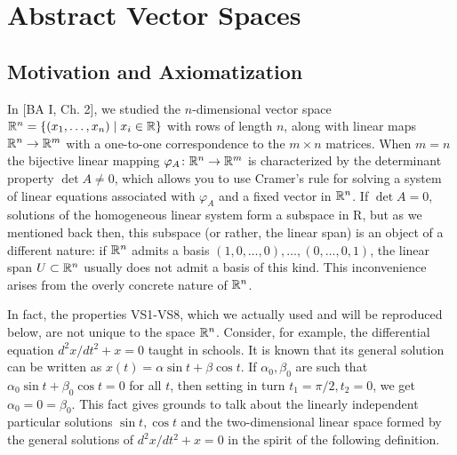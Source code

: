 \section{Abstract Vector Spaces}
\subsection{Motivation and Axiomatization}
In [BA I, Ch. 2], we studied the $n$-dimensional vector space ${\mathbb{R}}^n =\{(x_1,\dots ,x_n)\mid x_i \in {\mathbb{R}}\}$ with rows of length $n$, along with linear maps ${\mathbb{R}}^n \to {\mathbb{R}}^m$ with a one-to-one correspondence to the $m\times n$ matrices. When $m = n$ the bijective linear mapping $\varphi_A\colon {\mathbb{R}}^n \to {\mathbb{R}}^m$ is characterized by the determinant property $\det A \neq 0$, which allows you to use Cramer's rule for solving a system of linear equations associated with $\varphi_A$ and a fixed vector in ${\mathbb{R}}^n$. If $\det A = 0$, solutions of the homogeneous linear system form a subspace in R, but as we mentioned back then, this subspace (or rather, the linear span) is an object of a different nature: if ${\mathbb{R}}^n$ admits a basis $(1,0,\dots ,0),\dots ,(0,\dots ,0,1)$, the linear span $U\subset{\mathbb{R}}^n$ usually does not admit a basis of this kind. This inconvenience arises from the overly concrete nature of ${\mathbb{R}}^n$.

In fact, the properties VS1-VS8, which we actually used and will be reproduced below, are not unique to the space ${\mathbb{R}}^n$. Consider, for example, the differential equation $d^2x/dt^2+ x = 0$ taught in schools. It is known that its general solution can be written as $x (t) = \alpha \sin t+\beta \cos t$. If $\alpha_0 ,\beta_0$ are such that $\alpha_0 \sin t + \beta_0 \cos t = 0$ for all $t$, then setting in turn $t_1=\pi /2,t_2=0$, we get $\alpha_0 = 0 =\beta_0$. This fact gives grounds to talk about the linearly independent particular solutions $\sin t, \cos t$ and the two-dimensional linear space formed by the general solutions of $d^2x/dt^2+ x = 0$ in the spirit of the following definition.


